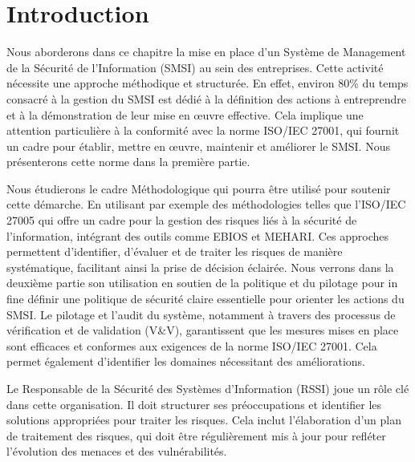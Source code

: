 \section{Introduction}

Nous aborderons dans ce chapitre la mise en place d'un Système de Management de la Sécurité de l'Information (SMSI) au sein des entreprises. Cette activité nécessite une approche méthodique et structurée. En effet, environ 80\% du temps consacré à la gestion du SMSI est dédié à la définition des actions à entreprendre et à la démonstration de leur mise en œuvre effective. Cela implique une attention particulière à la conformité avec la norme ISO/IEC 27001, qui fournit un cadre pour établir, mettre en œuvre, maintenir et améliorer le SMSI. Nous présenterons cette norme dans la première partie.

Nous étudierons le cadre Méthodologique qui pourra être utilisé pour soutenir cette démarche. En utilisant par exemple des méthodologies telles que l'ISO/IEC 27005 qui offre un cadre pour la gestion des risques liés à la sécurité de l'information, intégrant des outils comme EBIOS et MEHARI. Ces approches permettent d'identifier, d'évaluer et de traiter les risques de manière systématique, facilitant ainsi la prise de décision éclairée. Nous verrons dans la deuxième partie son utilisation en soutien de la politique et du pilotage pour in fine définir une politique de sécurité claire essentielle pour orienter les actions du SMSI. Le pilotage et l'audit du système, notamment à travers des processus de vérification et de validation (V&V), garantissent que les mesures mises en place sont efficaces et conformes aux exigences de la norme ISO/IEC 27001. Cela permet également d'identifier les domaines nécessitant des améliorations.

Le Responsable de la Sécurité des Systèmes d'Information (RSSI) joue un rôle clé dans cette organisation. Il doit structurer ses préoccupations et identifier les solutions appropriées pour traiter les risques. Cela inclut l'élaboration d'un plan de traitement des risques, qui doit être régulièrement mis à jour pour refléter l'évolution des menaces et des vulnérabilités.

